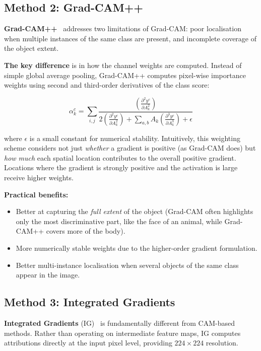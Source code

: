 \documentclass[12pt, a4paper]{article}
\begin{document}
\subsection{Method 2: Grad-CAM++}

\textbf{Grad-CAM++}~\cite{chattopadhay2018gradcampp} addresses two limitations
of Grad-CAM: poor localisation when multiple instances of the same class are
present, and incomplete coverage of the object extent.

\textbf{The key difference} is in how the channel weights are computed.  Instead
of simple global average pooling, Grad-CAM++ computes pixel-wise importance
weights using second and third-order derivatives of the class score:

\begin{equation}
\alpha_k^c = \sum_{i,j} \frac{\left(\frac{\partial^2 y^c}{\partial A_k^2}\right)}
{2 \left(\frac{\partial^2 y^c}{\partial A_k^2}\right) +
\sum_{a,b} A_k \left(\frac{\partial^3 y^c}{\partial A_k^3}\right) + \epsilon}
\end{equation}

where $\epsilon$ is a small constant for numerical stability.  Intuitively,
this weighting scheme considers not just \emph{whether} a gradient is positive
(as Grad-CAM does) but \emph{how much} each spatial location contributes to the
overall positive gradient.  Locations where the gradient is strongly positive
and the activation is large receive higher weights.

\textbf{Practical benefits:}
\begin{itemize}[leftmargin=*]
    \item Better at capturing the \emph{full extent} of the object (Grad-CAM
          often highlights only the most discriminative part, like the face of
          an animal, while Grad-CAM++ covers more of the body).
    \item More numerically stable weights due to the higher-order gradient
          formulation.
    \item Better multi-instance localisation when several objects of the same
          class appear in the image.
\end{itemize}

\subsection{Method 3: Integrated Gradients}

\textbf{Integrated Gradients} (IG)~\cite{sundararajan2017ig} is fundamentally
different from CAM-based methods.  Rather than operating on intermediate feature
maps, IG computes attributions directly at the input pixel level, providing
$224 \times 224$ resolution.
\end{document}
